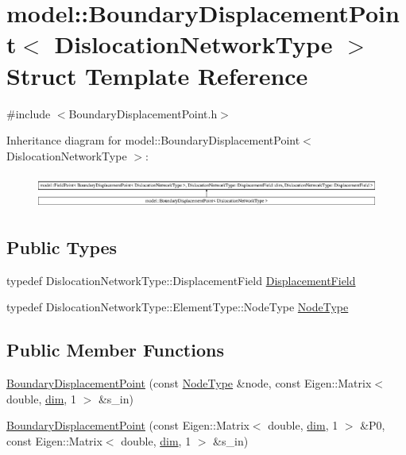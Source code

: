 \hypertarget{structmodel_1_1_boundary_displacement_point}{}\section{model\+:\+:Boundary\+Displacement\+Point$<$ Dislocation\+Network\+Type $>$ Struct Template Reference}
\label{structmodel_1_1_boundary_displacement_point}


{\ttfamily \#include $<$Boundary\+Displacement\+Point.\+h$>$}

Inheritance diagram for model\+:\+:Boundary\+Displacement\+Point$<$ Dislocation\+Network\+Type $>$\+:\begin{figure}[H]
\begin{center}
\leavevmode
\includegraphics[height=1.131313cm]{structmodel_1_1_boundary_displacement_point}
\end{center}
\end{figure}
\subsection*{Public Types}
\begin{DoxyCompactItemize}
\item 
typedef Dislocation\+Network\+Type\+::\+Displacement\+Field \hyperlink{structmodel_1_1_boundary_displacement_point_a23fe64b184320beea9fb5279bb488820}{Displacement\+Field}
\item 
typedef Dislocation\+Network\+Type\+::\+Element\+Type\+::\+Node\+Type \hyperlink{structmodel_1_1_boundary_displacement_point_a90d82718af9bb1fcca3c65b4959f83ec}{Node\+Type}
\end{DoxyCompactItemize}
\subsection*{Public Member Functions}
\begin{DoxyCompactItemize}
\item 
\hyperlink{structmodel_1_1_boundary_displacement_point_ad1835efb1e67e6794051a89edad6b0b1}{Boundary\+Displacement\+Point} (const \hyperlink{structmodel_1_1_boundary_displacement_point_a90d82718af9bb1fcca3c65b4959f83ec}{Node\+Type} \&node, const Eigen\+::\+Matrix$<$ double, \hyperlink{structmodel_1_1_boundary_displacement_point_a3e7d3e8f8cd6043d4a0d205cfef01f12}{dim}, 1 $>$ \&s\+\_\+in)
\item 
\hyperlink{structmodel_1_1_boundary_displacement_point_aa1ed0832fa716900775ee710395fb712}{Boundary\+Displacement\+Point} (const Eigen\+::\+Matrix$<$ double, \hyperlink{structmodel_1_1_boundary_displacement_point_a3e7d3e8f8cd6043d4a0d205cfef01f12}{dim}, 1 $>$ \&P0, const Eigen\+::\+Matrix$<$ double, \hyperlink{structmodel_1_1_boundary_displacement_point_a3e7d3e8f8cd6043d4a0d205cfef01f12}{dim}, 1 $>$ \&s\+\_\+in)
\end{DoxyCompactItemize}
